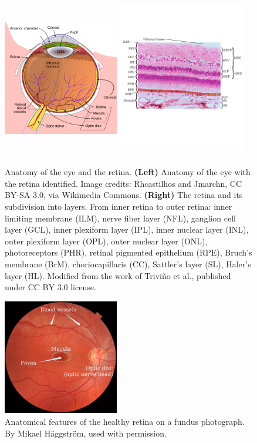 \documentclass[12pt,a4paper]{journal}
\begin{document}
\begin{figure}[hb]
  \centering
  \includegraphics[width=0.45\textwidth, height=7cm]{ArchitectureEye} %
  \hfill
  \includegraphics[width=0.5\textwidth, height=7cm]{RetinalLayers2}
  \caption{Anatomy of the eye and the retina. \textbf{(Left)} Anatomy of the eye with the retina identified. Image credits: Rhcastilhos and Jmarchn, CC BY-SA 3.0, via Wikimedia Commons. \textbf{(Right)} The retina and its subdivision into layers. From inner retina to outer retina: inner limiting membrane (ILM), nerve fiber layer (NFL), ganglion cell layer (GCL), inner plexiform layer (IPL), inner nuclear layer (INL), outer plexiform layer (OPL), outer nuclear layer (ONL), photoreceptors (PHR), retinal pigmented epithelium (RPE), Bruch's membrane (BrM), choriocapillaris (CC), Sattler's layer (SL), Haler's layer (HL). Modified from the work of Trivi\~no et al., published under CC BY 3.0 license.~\cite{Trivino_2012}}
  \label{fig:architecture-eye}
\end{figure}

\begin{figure}[ht]
  \centering
  \includegraphics[width=0.45\textwidth]{FA}
  \caption{Anatomical features of the healthy retina on a fundus photograph. By Mikael H\"aggstr\"om, used with permission.}
  \label{fig:Scans}
\end{figure}
\end{document}
